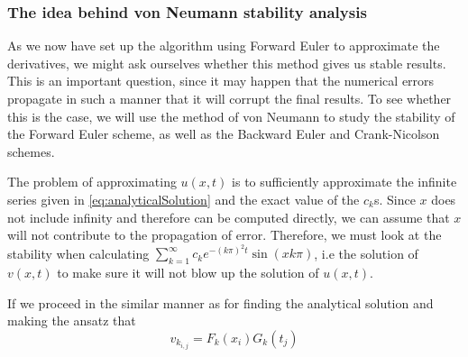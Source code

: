 \subsubsection{The idea behind von Neumann stability analysis}\label{sec:ideaNeumann}
As we now have set up the algorithm using Forward Euler to approximate the derivatives, we might ask ourselves whether this method gives us stable results. This is an important question, since it may happen that the numerical errors propagate in such a manner that it will corrupt the final results. To see whether this is the case, we will use the method of von Neumann to study the stability of the Forward Euler scheme, as well as the Backward Euler and Crank-Nicolson schemes.


The problem of approximating \(u(x,t)\) is to sufficiently approximate the infinite series given in \vref{eq:analyticalSolution} and the exact value of the \(c_k\)s. Since \( x\) does not include infinity and therefore can be computed directly, we can assume that \(x\) will not contribute to the propagation of error. Therefore, we must look at the stability when calculating \( \sum_{k=1}^\infty c_ke^{-(k\pi)^2t}\sin(xk\pi) \), i.e the solution of \(v(x,t)\) to make sure it will not blow up the solution of \(u(x,t)\).

If we proceed in the similar manner as for finding the analytical solution and making the ansatz that
\begin{equation}\label{eq:discreteAnsatz}
    v_{k_{i,j}} = F_k(x_i)G_k(t_j)
\end{equation}

